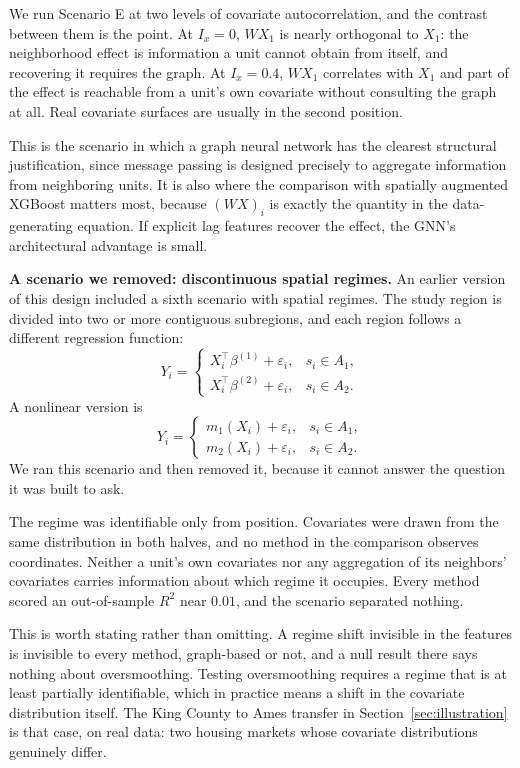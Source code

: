 \documentclass[ASNA, twocolumn]{USG} %
\begin{document}
We run Scenario E at two levels of covariate autocorrelation, and the contrast between them is the point. At \(I_x=0\), \(WX_1\) is nearly orthogonal to \(X_1\): the neighborhood effect is information a unit cannot obtain from itself, and recovering it requires the graph. At \(I_x=0.4\), \(WX_1\) correlates with \(X_1\) and part of the effect is reachable from a unit's own covariate without consulting the graph at all. Real covariate surfaces are usually in the second position.

This is the scenario in which a graph neural network has the clearest structural justification, since message passing is designed precisely to aggregate information from neighboring units. It is also where the comparison with spatially augmented XGBoost matters most, because \((WX)_i\) is exactly the quantity in the data-generating equation. If explicit lag features recover the effect, the GNN's architectural advantage is small.

\noindent \textbf{A scenario we removed: discontinuous spatial regimes.}
An earlier version of this design included a sixth scenario with spatial regimes. The study region is divided into two or more contiguous subregions, and each region follows a different regression function:
\[
Y_i =
\begin{cases}
X_i^\top\beta^{(1)} + \varepsilon_i, & s_i \in A_1,\\
X_i^\top\beta^{(2)} + \varepsilon_i, & s_i \in A_2.
\end{cases}
\]
A nonlinear version is
\[
Y_i =
\begin{cases}
m_1(X_i) + \varepsilon_i, & s_i \in A_1,\\
m_2(X_i) + \varepsilon_i, & s_i \in A_2.
\end{cases}
\]
We ran this scenario and then removed it, because it cannot answer the question it was built to ask.

The regime was identifiable only from position. Covariates were drawn from the same distribution in both halves, and no method in the comparison observes coordinates. Neither a unit's own covariates nor any aggregation of its neighbors' covariates carries information about which regime it occupies. Every method scored an out-of-sample \(R^2\) near \(0.01\), and the scenario separated nothing.

This is worth stating rather than omitting. A regime shift invisible in the features is invisible to every method, graph-based or not, and a null result there says nothing about oversmoothing. Testing oversmoothing requires a regime that is at least partially identifiable, which in practice means a shift in the covariate distribution itself. The King County to Ames transfer in Section~\ref{sec:illustration} is that case, on real data: two housing markets whose covariate distributions genuinely differ.
\end{document}
